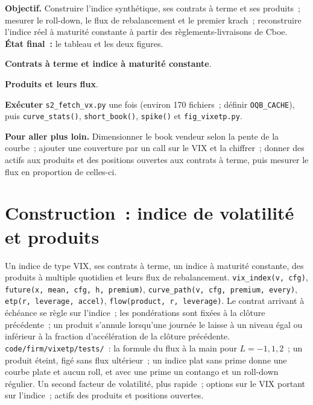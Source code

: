 \begin{tutorial}
\textbf{Objectif.} Construire l'indice synthétique, ses contrats à terme et ses produits~; mesurer le roll-down, le flux de rebalancement et le premier krach~; reconstruire l'indice réel
à maturité constante à partir des règlements-livraisons de Cboe. \textbf{État final~:} le tableau et les deux figures.
\begin{tutsteps}
\item \textbf{Contrats à terme et indice à maturité constante}.
\label{lst:s2:the-volatility-index-complex:curve}
\item \textbf{Produits et leurs flux}.
\label{lst:s2:the-volatility-index-complex:etp}
\item \textbf{Exécuter} \texttt{s2\_fetch\_vx.py} une fois (environ 170 fichiers~; définir \texttt{OQB\_CACHE}), puis \texttt{curve\_stats()}, \texttt{short\_book()},
\texttt{spike()} et \texttt{fig\_vixetp.py}.
\end{tutsteps}
\textbf{Pour aller plus loin.} Dimensionner le book vendeur selon la pente de la courbe~; ajouter une couverture par un call sur le VIX et la chiffrer~; donner des actifs aux produits et
des positions ouvertes aux contrats à terme, puis mesurer le flux en proportion de celles-ci.
\end{tutorial}

\section{Construction~: indice de volatilité et produits}\label{bld:s2:the-volatility-index-complex:vixetp}

\begin{build}
 Un indice de type VIX, ses contrats à terme, un indice à maturité constante, des produits à multiple quotidien et leurs flux de rebalancement.
 \texttt{vix\_index(v, cfg)}, \texttt{future(x, mean, cfg, h, premium)}, \texttt{curve\_path(v, cfg, premium, every)},
\texttt{etp(r, leverage, accel)}, \texttt{flow(product, r, leverage)}.
 Le contrat arrivant à échéance se règle sur l'indice~; les pondérations sont fixées à la clôture précédente~; un produit s'annule lorsqu'une journée le laisse à un niveau égal ou inférieur à la
fraction d'accélération de la clôture précédente.
 \texttt{code/firm/vixetp/tests/}~: la formule du flux à la main pour $L = -1, 1, 2$~; un produit éteint, figé sans
flux ultérieur~; un indice plat sans prime donne une courbe plate et aucun roll, et avec une prime un contango et un roll-down régulier.
 Un second facteur de volatilité, plus rapide~; options sur le VIX portant sur l'indice~; actifs des produits et positions ouvertes.
\end{build}

